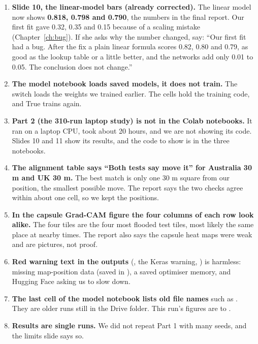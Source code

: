 \begin{enumerate}
\item \textbf{Slide 10, the linear-model bars (already corrected).} The linear model now shows \textbf{0.818, 0.798 and 0.790}, the numbers in the final report. Our first fit gave 0.32, 0.35 and 0.15 because of a scaling mistake (Chapter~\ref{ch:bug}). If she asks why the number changed, say: ``Our first fit had a bug. After the fix a plain linear formula scores 0.82, 0.80 and 0.79, as good as the lookup table or a little better, and the networks add only 0.01 to 0.05. The conclusion does not change.''
\item \textbf{The model notebook loads saved models, it does not train.} The switch  loads the weights we trained earlier. The  cells hold the training code, and True trains again.
\item \textbf{Part 2 (the 310-run laptop study) is not in the Colab notebooks.} It ran on a laptop CPU, took about 20 hours, and we are not showing its code. Slides 10 and 11 show its results, and the code to show is in the three notebooks.
\item \textbf{The alignment table says ``Both tests say move it'' for Australia 30 m and UK 30 m.} The best match is only one 30 m square from our position, the smallest possible move. The report says the two checks agree within about one cell, so we kept the positions.
\item \textbf{In the capsule Grad-CAM figure the four columns of each row look alike.} The four tiles are the four most flooded test tiles, most likely the same place at nearby times. The report also says the capsule heat maps were weak and are pictures, not proof.
\item \textbf{Red warning text in the outputs} (, the Keras  warning, ) is harmless: missing map-position data (saved in ), a saved optimiser memory, and Hugging Face asking us to slow down.
\item \textbf{The last cell of the model notebook lists old file names} such as . They are older runs still in the Drive folder. This run's figures are  to .
\item \textbf{Results are single runs.} We did not repeat Part 1 with many seeds, and the limits slide says so.
\end{enumerate}

